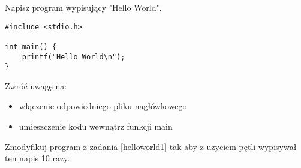 % 
% 
% 
% 


\dbEntryCheckResults
Napisz program wypisujący "Hello World".
\fi

\dbEntryCheckResults
\begin{verbatim}
#include <stdio.h>

int main() {
	printf("Hello World\n");
}
\end{verbatim}

\noindent Zwróć uwagę na:
\begin{itemize}
\item włączenie odpowiedniego pliku nagłówkowego
\item umieszczenie kodu wewnątrz funkcji main
\end{itemize}
\fi


\dbEntryCheckResults
Zmodyfikuj program z zadania \ref{helloworld1} tak aby z użyciem pętli wypisywał ten napis 10 razy.
\fi

